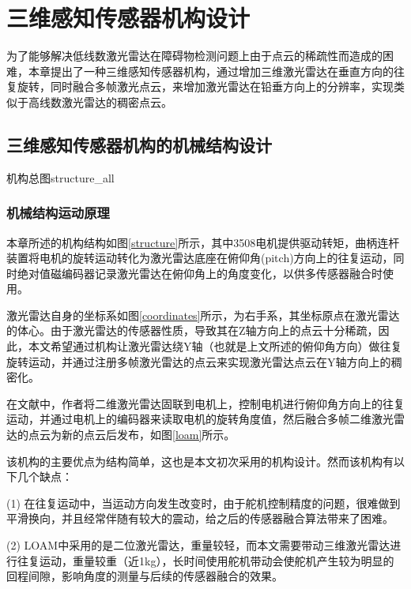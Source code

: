 
\chapter{三维感知传感器机构设计}
为了能够解决低线数激光雷达在障碍物检测问题上由于点云的稀疏性而造成的困难，本章提出了一种三维感知传感器机构，通过增加三维激光雷达在垂直方向的往复旋转，同时融合多帧激光点云，来增加激光雷达在铅垂方向上的分辨率，实现类似于高线数激光雷达的稠密点云。

\section{三维感知传感器机构的机械结构设计}
\begin{pics}[htbp]{机构总图}{structure_all}
\end{pics}
\subsection{机械结构运动原理}
本章所述的机构结构如图\ref{structure}所示，其中3508电机提供驱动转矩，曲柄连杆装置将电机的旋转运动转化为激光雷达底座在俯仰角(pitch)方向上的往复运动，同时绝对值磁编码器记录激光雷达在俯仰角上的角度变化，以供多传感器融合时使用。


激光雷达自身的坐标系如图\ref{coordinates}所示，为右手系，其坐标原点在激光雷达的体心。由于激光雷达的传感器性质，导致其在Z轴方向上的点云十分稀疏，因此，本文希望通过机构让激光雷达绕Y轴（也就是上文所述的俯仰角方向）做往复旋转运动，并通过注册多帧激光雷达的点云来实现激光雷达点云在Y轴方向上的稠密化。

在文献中，作者将二维激光雷达固联到电机上，控制电机进行俯仰角方向上的往复运动，并通过电机上的编码器来读取电机的旋转角度值，然后融合多帧二维激光雷达的点云为新的点云后发布，如图\ref{loam}所示。

该机构的主要优点为结构简单，这也是本文初次采用的机构设计。然而该机构有以下几个缺点：

(1) 在往复运动中，当运动方向发生改变时，由于舵机控制精度的问题，很难做到平滑换向，并且经常伴随有较大的震动，给之后的传感器融合算法带来了困难。

(2) LOAM中采用的是二位激光雷达，重量较轻，而本文需要带动三维激光雷达进行往复运动，重量较重（近1kg），长时间使用舵机带动会使舵机产生较为明显的回程间隙，影响角度的测量与后续的传感器融合的效果。

